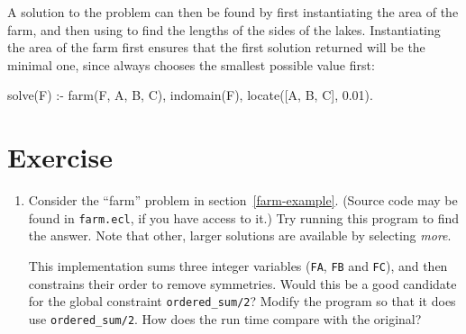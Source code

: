 A solution to the problem can then be found by first instantiating the area
of the farm, and then using 
to find the lengths of the sides of the lakes.  Instantiating the area of
the farm first ensures that the first solution returned will be the minimal
one, since  always
chooses the smallest possible value first:

\begin{code}
solve(F) :-
        farm(F, A, B, C),               %
        indomain(F),                    %
        locate([A, B, C], 0.01).
\end{code}

\section{Exercise}

\begin{enumerate}

\item

Consider the ``farm'' problem in section~\ref{farm-example}.  (Source code
may be found in \texttt{farm.ecl}, if you have access to it.) Try running
this program to find the answer.  Note that other, larger solutions are
available by selecting \emph{more}.

This implementation sums three integer variables (\texttt{FA}, \texttt{FB}
and \texttt{FC}), and then constrains their order to remove symmetries.
Would this be a good candidate for the global constraint
\texttt{ordered_sum/2}?  Modify the program so that it does use
\texttt{ordered_sum/2}.  How does the run time compare with the original?

\end{enumerate}


